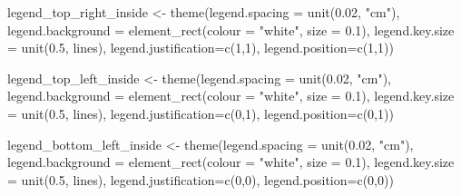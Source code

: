 \documentclass[
]{book}
\newenvironment{Shaded}{\begin{snugshade}}{\end{snugshade}}
\newcommand{\AttributeTok}[1]{\textcolor[rgb]{0.77,0.63,0.00}{#1}}
\newcommand{\DecValTok}[1]{\textcolor[rgb]{0.00,0.00,0.81}{#1}}
\newcommand{\FloatTok}[1]{\textcolor[rgb]{0.00,0.00,0.81}{#1}}
\newcommand{\FunctionTok}[1]{\textcolor[rgb]{0.00,0.00,0.00}{#1}}
\newcommand{\NormalTok}[1]{#1}
\newcommand{\OtherTok}[1]{\textcolor[rgb]{0.56,0.35,0.01}{#1}}
\newcommand{\StringTok}[1]{\textcolor[rgb]{0.31,0.60,0.02}{#1}}
\begin{document}
\begin{Shaded}
\begin{Highlighting}[]
\NormalTok{legend\_top\_right\_inside }\OtherTok{\textless{}{-}} \FunctionTok{theme}\NormalTok{(}\AttributeTok{legend.spacing =} \FunctionTok{unit}\NormalTok{(}\FloatTok{0.02}\NormalTok{, }\StringTok{"cm"}\NormalTok{),}
                                 \AttributeTok{legend.background =} \FunctionTok{element\_rect}\NormalTok{(}\AttributeTok{colour =} \StringTok{"white"}\NormalTok{, }\AttributeTok{size =} \FloatTok{0.1}\NormalTok{),}
                                 \AttributeTok{legend.key.size =} \FunctionTok{unit}\NormalTok{(}\FloatTok{0.5}\NormalTok{, }\StringTok{\textquotesingle{}lines\textquotesingle{}}\NormalTok{),}
                                 \AttributeTok{legend.justification=}\FunctionTok{c}\NormalTok{(}\DecValTok{1}\NormalTok{,}\DecValTok{1}\NormalTok{), }
                                 \AttributeTok{legend.position=}\FunctionTok{c}\NormalTok{(}\DecValTok{1}\NormalTok{,}\DecValTok{1}\NormalTok{))}

\NormalTok{legend\_top\_left\_inside }\OtherTok{\textless{}{-}} \FunctionTok{theme}\NormalTok{(}\AttributeTok{legend.spacing =} \FunctionTok{unit}\NormalTok{(}\FloatTok{0.02}\NormalTok{, }\StringTok{"cm"}\NormalTok{),}
                                \AttributeTok{legend.background =} \FunctionTok{element\_rect}\NormalTok{(}\AttributeTok{colour =} \StringTok{"white"}\NormalTok{, }\AttributeTok{size =} \FloatTok{0.1}\NormalTok{),}
                                \AttributeTok{legend.key.size =} \FunctionTok{unit}\NormalTok{(}\FloatTok{0.5}\NormalTok{, }\StringTok{\textquotesingle{}lines\textquotesingle{}}\NormalTok{),}
                                \AttributeTok{legend.justification=}\FunctionTok{c}\NormalTok{(}\DecValTok{0}\NormalTok{,}\DecValTok{1}\NormalTok{), }
                                \AttributeTok{legend.position=}\FunctionTok{c}\NormalTok{(}\DecValTok{0}\NormalTok{,}\DecValTok{1}\NormalTok{))}

\NormalTok{legend\_bottom\_left\_inside }\OtherTok{\textless{}{-}} \FunctionTok{theme}\NormalTok{(}\AttributeTok{legend.spacing =} \FunctionTok{unit}\NormalTok{(}\FloatTok{0.02}\NormalTok{, }\StringTok{"cm"}\NormalTok{),}
                                   \AttributeTok{legend.background =} \FunctionTok{element\_rect}\NormalTok{(}\AttributeTok{colour =} \StringTok{"white"}\NormalTok{, }\AttributeTok{size =} \FloatTok{0.1}\NormalTok{),}
                                   \AttributeTok{legend.key.size =} \FunctionTok{unit}\NormalTok{(}\FloatTok{0.5}\NormalTok{, }\StringTok{\textquotesingle{}lines\textquotesingle{}}\NormalTok{),}
                                   \AttributeTok{legend.justification=}\FunctionTok{c}\NormalTok{(}\DecValTok{0}\NormalTok{,}\DecValTok{0}\NormalTok{), }
                                   \AttributeTok{legend.position=}\FunctionTok{c}\NormalTok{(}\DecValTok{0}\NormalTok{,}\DecValTok{0}\NormalTok{))}


\end{Highlighting}
\end{Shaded}
\end{document}
